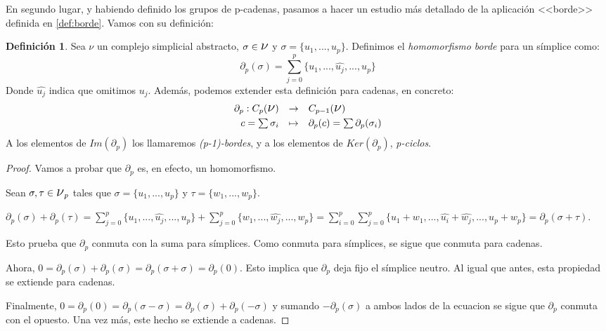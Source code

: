 \documentclass[12pt, a4paper]{article}
\numberwithin{equation}{section}
\theoremstyle{definition}
\newtheorem{defi}{Definición}
\theoremstyle{remark}
\theoremstyle{plain}
\begin{document}
	En segundo lugar, y habiendo definido los grupos de p-cadenas, pasamos
	a hacer un estudio más detallado de la aplicación <<borde>> definida 
	en \ref{def:borde}. Vamos con su definición:

	\begin{defi}
		Sea {\Large $\nu$} un complejo simplicial abstracto, $\sigma 
		\in \text{{\Large $\nu$}}$ y $\sigma = \{u_{1},...,u_{p}\}$. 
		Definimos el \textit{homomorfismo borde} para un símplice 
		como:
		$$
		\partial_{p}(\sigma)=\displaystyle 
		\sum_{j=0}^{p}\{u_{1},...,\widehat{u_{j}},...,u_{p}\}
		$$
 		Donde $\widehat{u_{j}}$ indica que omitimos $u_{j}$. Además,
		podemos extender esta definición para cadenas, en concreto:
	\begin{equation}
		\label{def:borde_form}
		\begin{array}{lll}
			\partial_{p}:C_{p}(\text{{\Large $\nu$}}) & 
				\rightarrow & C_{p-1}(\text{{\Large $\nu$}})
				\\[3pt] 
			\multicolumn{1}{r}{c=\sum\sigma_{i}} & \mapsto & 
			\partial_{p}(c)=\sum\partial_{p}(\sigma_{i})
		\end{array}
	\end{equation}
	A los elementos de $Im(\partial_{p})$ los llamaremos 
	\textit{(p-1)-bordes}, y a los elementos de $Ker(\partial_{p})$, 
	\textit{p-ciclos}.
	\end{defi}
	\begin{proof}
		Vamos a probar que $\partial_{p}$ es, en efecto, un 
		homomorfismo.

		Sean $\sigma,\tau \in \text{{\Large $\nu$}}_{p}$ tales que
		$\sigma = \{u_{1},...,u_{p}\}$ y $\tau = \{w_{1},...,w_{p}\}$.

		$\partial_{p}(\sigma)+\partial_{p}(\tau)=\displaystyle 
		\sum_{j=0}^{p}\{u_{1},...,\widehat{u_{j}},...,u_{p}\} + 
		\displaystyle \sum_{j=0}^{p}\{w_{1},...,\widehat{w_{j}},...,
		w_{p}\}=\displaystyle \sum_{i=0}^{p}\sum_{j=0}^{p}\{u_{1} + 
		w_{1},...,\widehat{u_{i}} + \widehat{w_{j}},...,u_{p}+w_{p}\}=
		\partial_{p}(\sigma+\tau)$. 

		Esto prueba que $\partial_{p}$ conmuta con la suma para 
		símplices. Como conmuta para símplices, se sigue que conmuta 
		para cadenas.

		Ahora, $0=\partial_{p}(\sigma)+\partial_{p}(\sigma)=
		\partial_{p}(\sigma + \sigma)=\partial_{p}(0)$. Esto implica 
		que $\partial_{p}$ deja fijo el símplice neutro. Al igual que
		antes, esta propiedad se extiende para cadenas.

		Finalmente, $0=\partial_{p}(0)=\partial_{p}(\sigma - \sigma)=
		\partial_{p}(\sigma)+\partial_{p}(-\sigma)$ y sumando 
		$-\partial_{p}(\sigma)$ a ambos lados de la ecuacion se sigue 
		que $\partial_{p}$ conmuta con el opuesto. Una vez más, este 
		hecho se extiende a cadenas.
	\end{proof}
\end{document}
